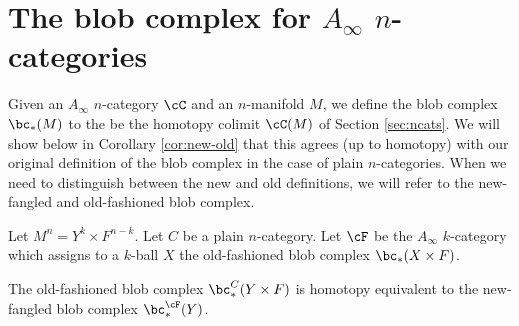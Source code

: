 
\section{The blob complex for $A_\infty$ $n$-categories}
\label{sec:ainfblob}

Given an $A_\infty$ $n$-category $\cC$ and an $n$-manifold $M$, we define the blob
complex $\bc_*(M)$ to the be the homotopy colimit $\cC(M)$ of Section \ref{sec:ncats}.
We will show below 
in Corollary \ref{cor:new-old}
that this agrees (up to homotopy) with our original definition of the blob complex
in the case of plain $n$-categories.
When we need to distinguish between the new and old definitions, we will refer to the 
new-fangled and old-fashioned blob complex.

\medskip

Let $M^n = Y^k\times F^{n-k}$.  
Let $C$ be a plain $n$-category.
Let $\cF$ be the $A_\infty$ $k$-category which assigns to a $k$-ball
$X$ the old-fashioned blob complex $\bc_*(X\times F)$.

\begin{thm} \label{product_thm}
The old-fashioned blob complex $\bc_*^C(Y\times F)$ is homotopy equivalent to the
new-fangled blob complex $\bc_*^\cF(Y)$.
\end{thm}



